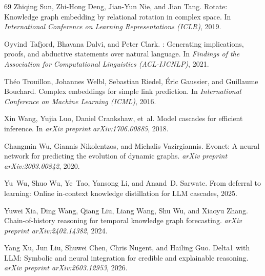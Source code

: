 \documentclass[11pt]{article}
\theoremstyle{plain}
\begin{document}
{\begin{thebibliography}{69}
Zhiqing Sun, Zhi-Hong Deng, Jian-Yun Nie, and Jian Tang.
\newblock Rotate: Knowledge graph embedding by relational rotation in complex
  space.
\newblock In \emph{International Conference on Learning Representations
  (ICLR)}, 2019.

Oyvind Tafjord, Bhavana Dalvi, and Peter Clark.
: Generating implications, proofs, and abductive
  statements over natural language.
\newblock In \emph{Findings of the Association for Computational Linguistics
  (ACL-IJCNLP)}, 2021.

Th{\'e}o Trouillon, Johannes Welbl, Sebastian Riedel, {\'E}ric Gaussier, and
  Guillaume Bouchard.
\newblock Complex embeddings for simple link prediction.
\newblock In \emph{International Conference on Machine Learning (ICML)}, 2016.

Xin Wang, Yujia Luo, Daniel Crankshaw, et~al.
\newblock Model cascades for efficient inference.
\newblock In \emph{arXiv preprint arXiv:1706.00885}, 2018.

Changmin Wu, Giannis Nikolentzos, and Michalis Vazirgiannis.
\newblock Evonet: A neural network for predicting the evolution of dynamic
  graphs.
\newblock \emph{arXiv preprint arXiv:2003.00842}, 2020.

Yu~Wu, Shuo Wu, Ye~Tao, Yansong Li, and Anand~D. Sarwate.
\newblock From deferral to learning: Online in-context knowledge distillation
  for {LLM} cascades, 2025.

Yuwei Xia, Ding Wang, Qiang Liu, Liang Wang, Shu Wu, and Xiaoyu Zhang.
\newblock Chain-of-history reasoning for temporal knowledge graph forecasting.
\newblock \emph{arXiv preprint arXiv:2402.14382}, 2024.

Yang Xu, Jun Liu, Shuwei Chen, Chris Nugent, and Hailing Guo.
\newblock Delta1 with {LLM}: Symbolic and neural integration for credible and
  explainable reasoning.
\newblock \emph{arXiv preprint arXiv:2603.12953}, 2026.


\end{thebibliography}}
\end{document}
